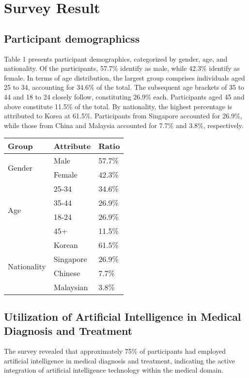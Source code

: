 \documentclass{ieeeaccess}
\begin{document}
\section{Survey Result}
\subsection{Participant demographicss}
Table 1 presents participant demographics, categorized by gender, age, and nationality. Of the participants, 57.7\% identify as male, while 42.3\% identify as female. In terms of age distribution, the largest group comprises individuals aged 25 to 34, accounting for 34.6\% of the total. The subsequent age brackets of 35 to 44 and 18 to 24 closely follow, constituting 26.9\% each. Participants aged 45 and above constitute 11.5\% of the total. By nationality, the highest percentage is attributed to Korea at 61.5\%. Participants from Singapore accounted for 26.9\%, while those from China and Malaysia accounted for 7.7\% and 3.8\%, respectively.

\begin{table}[hbt!]
\begin{tabular}{|l|l|l|}
\hline
Group                        & Attribute & Ratio  \\ \hline
\multirow{2}{*}{Gender}      & Male      & 57.7\% \\ \cline{2-3} 
                             & Female    & 42.3\% \\ \hline
\multirow{4}{*}{Age}         & 25-34     & 34.6\% \\ \cline{2-3} 
                             & 35-44     & 26.9\% \\ \cline{2-3} 
                             & 18-24     & 26.9\% \\ \cline{2-3} 
                             & 45+       & 11.5\% \\ \hline
\multirow{4}{*}{Nationality} & Korean    & 61.5\% \\ \cline{2-3} 
                             & Singapore & 26.9\% \\ \cline{2-3} 
                             & Chinese   & 7.7\%  \\ \cline{2-3} 
                             & Malaysian & 3.8\%  \\ \hline
\end{tabular}
\end{table}

\subsection{Utilization of Artificial Intelligence in Medical Diagnosis and Treatment}
The survey revealed that approximately 75\% of participants had employed artificial intelligence in medical diagnosis and treatment, indicating the active integration of artificial intelligence technology within the medical domain.
\end{document}
